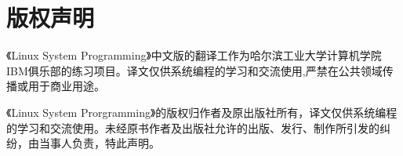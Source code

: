\chapter{版权声明}
《Linux System Programming》中文版的翻译工作为哈尔滨工业大学计算机学院IBM俱乐部的练习项目。译文仅供系统编程的学习和交流使用,严禁在公共领域传播或用于商业用途。

《Linux System Prorgramming》的版权归作者及原出版社所有，译文仅供系统编程的学习和交流使用。未经原书作者及出版社允许的出版、发行、制作所引发的纠纷，由当事人负责，特此声明。

